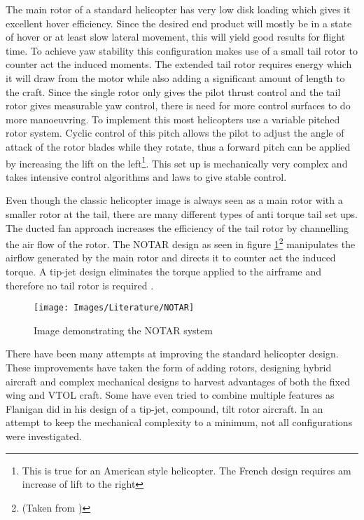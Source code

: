 	The main rotor of a standard helicopter has very low disk loading which gives it excellent hover efficiency. Since the desired end product will mostly be in a state of hover or at least slow lateral movement, this will yield good results for flight time. To achieve yaw stability this configuration makes use of a small tail rotor to counter act the induced moments. The extended tail rotor requires energy which it will draw from the motor while also adding a significant amount of length to the craft. Since the single rotor only gives the pilot thrust control and the tail rotor gives measurable yaw control, there is need for more control surfaces to do more manoeuvring. To implement this most helicopters use a variable pitched rotor system. Cyclic control of this pitch allows the pilot to adjust the angle of attack of the rotor blades while they rotate, thus a forward pitch can be applied by increasing the lift on the left\footnote{This is true for an American style helicopter. The French design requires am increase of lift to the right}. This set up is mechanically very complex and takes intensive control algorithms and laws to give stable control.
	
	Even though the classic helicopter image is always seen as a main rotor with a smaller rotor at the tail, there are many different types of anti torque tail set ups. The ducted fan approach increases the efficiency of the tail rotor by channelling the air flow of the rotor. The NOTAR design \cite{US4200252} as seen in figure \ref{IM_NOTAR}\footnote{(Taken from \cite{Heli})} manipulates the airflow generated by the main rotor and directs it to counter act the induced torque. A tip-jet design eliminates the torque applied to the airframe and therefore no tail rotor is required \cite{RotorConfig}. 
	
	\begin{figure}[H]
	\centering
	\texttt{[image: Images/Literature/NOTAR]}     
	\caption{Image demonstrating the NOTAR system \cite{Heli}}
	\label{IM_NOTAR}
	\end{figure}
	
	There have been many attempts at improving the standard helicopter design. These improvements have taken the form of adding rotors, designing hybrid aircraft and complex mechanical designs to harvest advantages of both the fixed wing and VTOL craft. Some have even tried to combine multiple features as Flanigan \cite{US7147182} did in his design of a tip-jet, compound, tilt rotor aircraft. 
	In an attempt to keep the mechanical complexity to a minimum, not all configurations were investigated.
	
